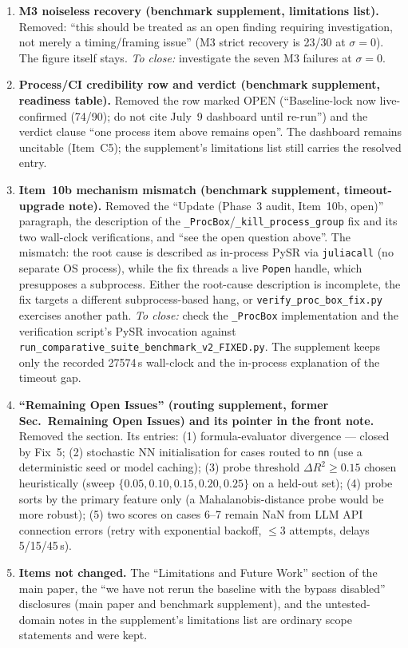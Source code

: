 \documentclass[11pt]{article}
\begin{document}
\begin{enumerate}
\texttt{n\_candidates}\ldots; this remains open pending that rerun.'' The paper keeps the factual statement that \texttt{run\_all.sh} STEP~7/8 pass \texttt{--temperature 0.25}.
\emph{To close:} a full-budget rerun whose result JSON records both fields.
\item \textbf{M3 noiseless recovery (benchmark supplement, limitations list).} Removed: ``this should be treated as an open finding requiring investigation, not merely a timing/framing issue''
(M3 strict recovery is 23/30 at $\sigma=0$). The figure itself stays. \emph{To close:} investigate the seven M3 failures at $\sigma=0$.
\item \textbf{Process/CI credibility row and verdict (benchmark supplement, readiness table).} Removed the row marked OPEN
(``Baseline-lock now live-confirmed (74/90); do not cite July~9 dashboard until re-run'') and the verdict clause ``one process item above remains open''.
The dashboard remains uncitable (Item~C5); the supplement's limitations list still carries the resolved entry.
\item \textbf{Item~10b mechanism mismatch (benchmark supplement, timeout-upgrade note).} Removed the ``Update (Phase~3 audit, Item~10b, open)'' paragraph, the
description of the \texttt{\_ProcBox}/\texttt{\_kill\_process\_group} fix and its two wall-clock verifications, and ``see the open question above''. The mismatch:
the root cause is described as in-process PySR via \texttt{juliacall} (no separate OS process), while the fix threads a live \texttt{Popen} handle, which presupposes a
subprocess. Either the root-cause description is incomplete, the fix targets a different subprocess-based hang, or \texttt{verify\_proc\_box\_fix.py} exercises another path.
\emph{To close:} check the \texttt{\_ProcBox} implementation and the verification script's PySR invocation against \texttt{run\_comparative\_suite\_benchmark\_v2\_FIXED.py}.
The supplement keeps only the recorded 27574\,s wall-clock and the in-process explanation of the timeout gap.
\item \textbf{``Remaining Open Issues'' (routing supplement, former Sec.~Remaining Open Issues) and its pointer in the front note.} Removed the section. Its entries:
(1) formula-evaluator divergence --- closed by Fix~5; (2) stochastic NN initialisation for cases routed to \texttt{nn} (use a deterministic seed or model caching);
(3) probe threshold $\Delta R^2\ge0.15$ chosen heuristically (sweep $\{0.05,0.10,0.15,0.20,0.25\}$ on a held-out set); (4) probe sorts by the primary feature only
(a Mahalanobis-distance probe would be more robust); (5) two scores on cases 6--7 remain NaN from LLM API connection errors (retry with exponential backoff, $\le3$ attempts, delays 5/15/45\,s).
\item \textbf{Items not changed.} The ``Limitations and Future Work'' section of the main paper, the ``we have not rerun the baseline with the bypass disabled'' disclosures
(main paper and benchmark supplement), and the untested-domain notes in the supplement's limitations list are ordinary scope statements and were kept.
\end{enumerate}
\end{document}
